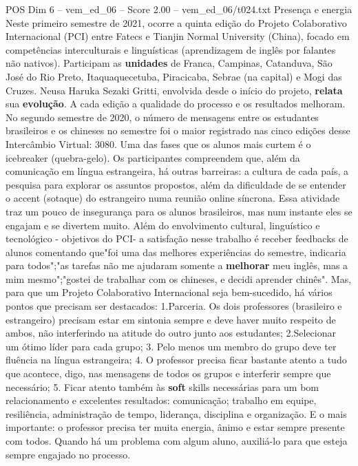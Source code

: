 \begin{textsample}{POS Dim 6 – vem\_ed\_06 – Score 2.00 – vem\_ed\_06/t024.txt}  \label{ex:f6_pos_075}
Presença e energia Neste primeiro semestre de 2021, ocorre a quinta edição do Projeto Colaborativo Internacional (PCI) entre Fatecs e Tianjin Normal University (China), focado em competências interculturais e linguísticas (aprendizagem de inglês por falantes não nativos).
Participam as \textbf{unidades} de Franca, Campinas, Catanduva, São José do Rio Preto, Itaquaquecetuba, Piracicaba, Sebrae (na capital) e Mogi das Cruzes.
Neusa Haruka Sezaki Gritti, envolvida desde o início do projeto, \textbf{relata} sua \textbf{evolução}.
A cada edição a qualidade do processo e os resultados melhoram.
No segundo semestre de 2020, o número de mensagens entre os estudantes brasileiros e os chineses no semestre foi o maior registrado nas cinco edições desse Intercâmbio Virtual: 3080.
Uma das fases que os alunos mais curtem é o icebreaker (quebra-gelo).
Os participantes compreendem que, além da comunicação em língua estrangeira, há outras barreiras: a cultura de cada país, a pesquisa para explorar os assuntos propostos, além da dificuldade de se entender o accent (sotaque) do estrangeiro numa reunião online síncrona.
Essa atividade traz um pouco de insegurança para os alunos brasileiros, mas num instante eles se engajam e se divertem muito.
Além do envolvimento cultural, linguístico e tecnológico - objetivos do PCI- a satisfação nesse trabalho é receber feedbacks de alunos comentando que"foi uma das melhores experiências do semestre, indicaria para todos";"as tarefas não me ajudaram somente a \textbf{melhorar} meu inglês, mas a mim mesmo";"gostei de trabalhar com os chineses, e decidi aprender chinês".
Mas, para que um Projeto Colaborativo Internacional seja bem-sucedido, há vários pontos que precisam ser destacados: 1.Parceria.
Os dois professores (brasileiro e estrangeiro) precisam estar em sintonia sempre e deve haver muito respeito de ambos, não interferindo na atitude do outro junto aos estudantes; 2.Selecionar um ótimo líder para cada grupo; 3.
Pelo menos um membro do grupo deve ter fluência na língua estrangeira; 4.
O professor precisa ficar bastante atento a tudo que acontece, digo, nas mensagens de todos os grupos e interferir sempre que necessário; 5.
Ficar atento também às \textbf{soft} skills necessárias para um bom relacionamento e excelentes resultados: comunicação; trabalho em equipe, resiliência, administração de tempo, liderança, disciplina e organização.
E o mais importante: o professor precisa ter muita energia, ânimo e estar sempre presente com todos.
Quando há um problema com algum aluno, auxiliá-lo para que esteja sempre engajado no processo.

\end{textsample}
